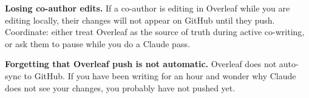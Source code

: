 \begin{pitfallbox}
\textbf{Losing co-author edits.} If a co-author is editing in Overleaf while you are editing locally, their changes will not appear on GitHub until they push. Coordinate: either treat Overleaf as the source of truth during active co-writing, or ask them to pause while you do a Claude pass.
\end{pitfallbox}

\begin{pitfallbox}
\textbf{Forgetting that Overleaf push is not automatic.} Overleaf does not auto-sync to GitHub. If you have been writing for an hour and wonder why Claude does not see your changes, you probably have not pushed yet.
\end{pitfallbox}
